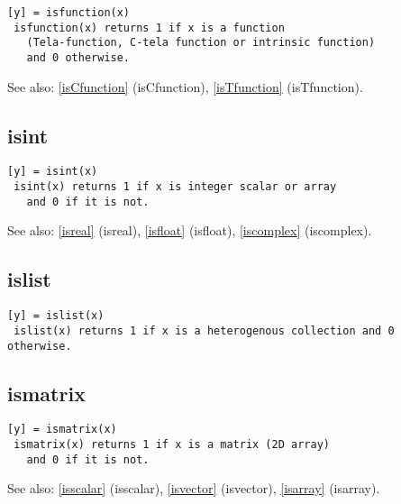 \documentclass[a4paper]{article}
\begin{document}
\begin{tscreen}
\begin{verbatim}
[y] = isfunction(x)
 isfunction(x) returns 1 if x is a function
   (Tela-function, C-tela function or intrinsic function)
   and 0 otherwise.
\end{verbatim}

See also: \ref{isCfunction} {(isCfunction)}, \ref{isTfunction} {(isTfunction)}.
\end{tscreen}





\subsection{isint\label{isint}}

\begin{tscreen}
\begin{verbatim}
[y] = isint(x)
 isint(x) returns 1 if x is integer scalar or array
   and 0 if it is not.
\end{verbatim}

See also: \ref{isreal} {(isreal)}, \ref{isfloat} {(isfloat)}, \ref{iscomplex} {(iscomplex)}.
\end{tscreen}





\subsection{islist\label{islist}}

\begin{tscreen}
\begin{verbatim}
[y] = islist(x)
 islist(x) returns 1 if x is a heterogenous collection and 0 otherwise. 
\end{verbatim}
\end{tscreen}





\subsection{ismatrix\label{ismatrix}}

\begin{tscreen}
\begin{verbatim}
[y] = ismatrix(x)
 ismatrix(x) returns 1 if x is a matrix (2D array)
   and 0 if it is not.
\end{verbatim}

See also: \ref{isscalar} {(isscalar)}, \ref{isvector} {(isvector)}, \ref{isarray} {(isarray)}.
\end{tscreen}
\end{document}
